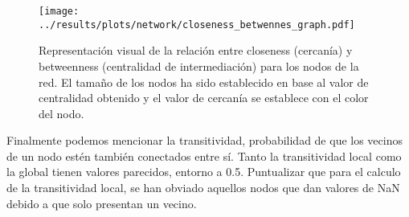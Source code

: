 \begin{figure}[h]
	\centering
	\texttt{[image: ../results/plots/network/closeness\_betwennes\_graph.pdf]}
	\caption{Representación visual de la relación entre closeness (cercanía) y betweenness (centralidad de intermediación) para los nodos de la red. 
    El tamaño de los nodos ha sido establecido en base al valor de centralidad obtenido y el valor de cercanía se establece con el color del nodo.}
	\label{fig:closeness_betweenness}
\end{figure}

Finalmente podemos mencionar la transitividad, probabilidad de que los vecinos de un nodo estén también conectados entre sí.
Tanto la transitividad local como la global tienen valores parecidos, entorno a 0.5. Puntualizar que para el calculo de la transitividad local, se han obviado aquellos nodos que dan valores de NaN debido a que solo presentan un vecino.
